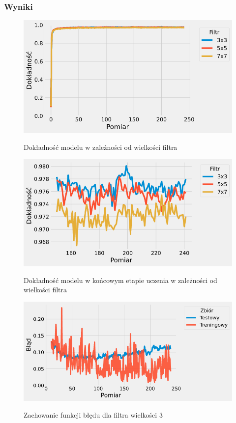 \documentclass{article}
\begin{document}
\subsubsection*{Wyniki}
\begin{figure}[H]
	\centering
	\caption{Dokładność modelu w zależności od wielkości filtra}
	\includegraphics[width=\textwidth]{kernel_acc.png}
	\label{fig:res11}
\end{figure}
\begin{figure}[H]
	\centering
	\caption{Dokładność modelu w końcowym etapie uczenia w zależności od wielkości filtra}
	\includegraphics[width=\textwidth]{kernel_acc_zoom.png}
	\label{fig:res12}
\end{figure}
\begin{figure}[H]
	\centering
	\caption{Zachowanie funkcji błędu dla filtra wielkości 3}
	\includegraphics[width=\textwidth]{kernel_err_3.png}
	\label{fig:res13}
\end{figure}
\end{document}
